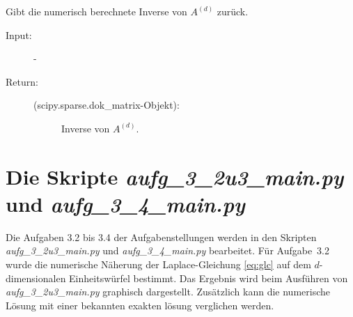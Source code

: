 \documentclass[letterpaper,10pt,ngerman, oneside, openright]{sphinxmanual}
\begin{document}
\begin{fulllineitems}
\begin{fulllineitems}
\begin{description}
\begin{description}
\end{description}

\end{description}

\end{fulllineitems}


\begin{fulllineitems}
\label{\detokenize{index:sparse_erw.Sparse.return_mat_d_inv}}
Gibt die numerisch berechnete Inverse von $A^{(d)}$ zurück.

\begin{description}
\item [{Input:}] -
\end{description}
\begin{description}
\item[{Return:}] \leavevmode\begin{description}
\item[{(scipy.sparse.dok\_matrix-Objekt):}] \leavevmode
Inverse von $A^{(d)}$.

\end{description}

\end{description}

\end{fulllineitems}


\end{fulllineitems}

\chapter{Die Skripte \textit{aufg\_3\_2u3\_main.py} und \textit{aufg\_3\_4\_main.py}}

Die Aufgaben 3.2 bis 3.4 der Aufgabenstellungen werden in den Skripten \textit{aufg\_3\_2u3\_main.py} und \textit{aufg\_3\_4\_main.py} bearbeitet. Für Aufgabe~3.2 wurde die numerische Näherung der Laplace-Gleichung \eqref{eq:glc} auf dem $d$-dimensionalen Einheitswürfel bestimmt. Das Ergebnis wird beim Ausführen von \textit{aufg\_3\_2u3\_main.py} graphisch dargestellt. Zusätzlich kann die numerische Lösung mit einer bekannten exakten lösung verglichen werden.
\end{document}
